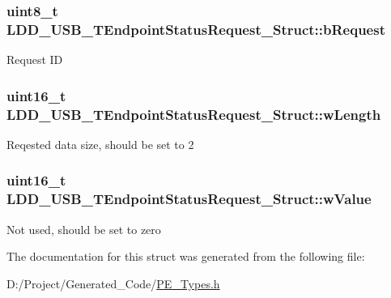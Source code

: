 \subsubsection[{b\+Request}]{\setlength{\rightskip}{0pt plus 5cm}uint8\+\_\+t L\+D\+D\+\_\+\+U\+S\+B\+\_\+\+T\+Endpoint\+Status\+Request\+\_\+\+Struct\+::b\+Request}\label{struct_l_d_d___u_s_b___t_endpoint_status_request___struct_ae8ab1e11dae5a0b3a4b4a7256a542175}
Request I\+D \hypertarget{struct_l_d_d___u_s_b___t_endpoint_status_request___struct_addba57e934f9c77c9159d7be618dd6dc}{}
\subsubsection[{w\+Length}]{\setlength{\rightskip}{0pt plus 5cm}uint16\+\_\+t L\+D\+D\+\_\+\+U\+S\+B\+\_\+\+T\+Endpoint\+Status\+Request\+\_\+\+Struct\+::w\+Length}\label{struct_l_d_d___u_s_b___t_endpoint_status_request___struct_addba57e934f9c77c9159d7be618dd6dc}
Reqested data size, should be set to 2 \hypertarget{struct_l_d_d___u_s_b___t_endpoint_status_request___struct_a987fe8c9322a22d8b5118eccd4de42c8}{}
\subsubsection[{w\+Value}]{\setlength{\rightskip}{0pt plus 5cm}uint16\+\_\+t L\+D\+D\+\_\+\+U\+S\+B\+\_\+\+T\+Endpoint\+Status\+Request\+\_\+\+Struct\+::w\+Value}\label{struct_l_d_d___u_s_b___t_endpoint_status_request___struct_a987fe8c9322a22d8b5118eccd4de42c8}
Not used, should be set to zero 

The documentation for this struct was generated from the following file\+:\begin{DoxyCompactItemize}
\item 
D\+:/\+Project/\+Generated\+\_\+\+Code/\hyperlink{_p_e___types_8h}{P\+E\+\_\+\+Types.\+h}\end{DoxyCompactItemize}
